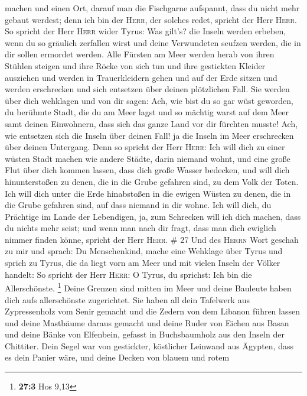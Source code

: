 machen und einen Ort, darauf man die Fischgarne aufspannt, dass du nicht
mehr gebaut werdest; denn ich bin der \textsc{Herr}, der solches redet,
spricht der Herr \textsc{Herr}.  So spricht der Herr
\textsc{Herr} wider Tyrus: Was gilt's? die Inseln werden erbeben, wenn
du so gräulich zerfallen wirst und deine Verwundeten seufzen werden, die
in dir sollen ermordet werden.  Alle Fürsten am Meer
werden herab von ihren Stühlen steigen und ihre Röcke von sich tun und
ihre gestickten Kleider ausziehen und werden in Trauerkleidern gehen und
auf der Erde sitzen und werden erschrecken und sich entsetzen über
deinen plötzlichen Fall.  Sie werden über dich wehklagen
und von dir sagen: Ach, wie bist du so gar wüst geworden, du berühmte
Stadt, die du am Meer lagst und so mächtig warst auf dem Meer samt
deinen Einwohnern, dass sich das ganze Land vor dir fürchten musste!
 Ach, wie entsetzen sich die Inseln über deinen Fall! ja
die Inseln im Meer erschrecken über deinen Untergang. 
Denn so spricht der Herr \textsc{Herr}: Ich will dich zu einer wüsten
Stadt machen wie andere Städte, darin niemand wohnt, und eine große Flut
über dich kommen lassen, dass dich große Wasser bedecken,
 und will dich hinunterstoßen zu denen, die in die Grube
gefahren sind, zu dem Volk der Toten. Ich will dich unter die Erde
hinabstoßen in die ewigen Wüsten zu denen, die in die Grube gefahren
sind, auf dass niemand in dir wohne. Ich will dich, du Prächtige im
Lande der Lebendigen,  ja, zum Schrecken will ich dich
machen, dass du nichts mehr seist; und wenn man nach dir fragt, dass man
dich ewiglich nimmer finden könne, spricht der Herr \textsc{Herr}. \# 27
 Und des \textsc{Herrn} Wort geschah zu mir und sprach:
 Du Menschenkind, mache eine Wehklage über Tyrus
 und sprich zu Tyrus, die da liegt vorn am Meer und mit
vielen Inseln der Völker handelt: So spricht der Herr \textsc{Herr}: O
Tyrus, du sprichst: Ich bin die Allerschönste. \footnote{\textbf{27:3}
  Hos 9,13}  Deine Grenzen sind mitten im Meer und deine
Bauleute haben dich aufs allerschönste zugerichtet.  Sie
haben all dein Tafelwerk aus Zypressenholz vom Senir gemacht und die
Zedern von dem Libanon führen lassen und deine Mastbäume daraus gemacht
 und deine Ruder von Eichen aus Basan und deine Bänke von
Elfenbein, gefasst in Buchsbaumholz aus den Inseln der Chittiter.
 Dein Segel war von gestickter, köstlicher Leinwand aus
Ägypten, dass es dein Panier wäre, und deine Decken von blauem und rotem
